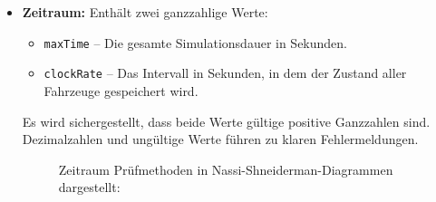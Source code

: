 \begin{itemize}
  \item \textbf{Zeitraum:} Enthält zwei ganzzahlige Werte:
  \begin{itemize}
    \item \texttt{maxTime} -- Die gesamte Simulationsdauer in Sekunden.
    \item \texttt{clockRate} -- Das Intervall in Sekunden, in dem der Zustand aller Fahrzeuge gespeichert wird.
  \end{itemize}
  Es wird sichergestellt, dass beide Werte gültige positive Ganzzahlen sind. Dezimalzahlen und ungültige Werte führen zu klaren Fehlermeldungen.

 

\begin{figure}[h!]
    \centering
    \caption{Zeitraum Prüfmethoden in Nassi-Shneiderman-Diagrammen dargestellt:}
\end{figure}

\clearpage


\end{itemize}
